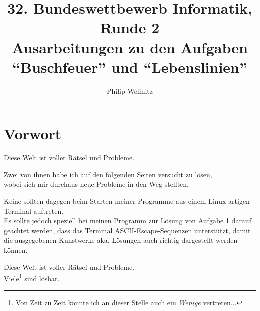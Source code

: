 \documentclass[a4paper,12pt,table]{article}
\title{32. Bundeswettbewerb Informatik, Runde 2\\ \small{Ausarbeitungen zu den Aufgaben \enquote{Buschfeuer} und \enquote{Lebenslinien} }}
\author{Philip Wellnitz}
\date{}
\begin{document}
\thispagestyle{empty}
\maketitle
\newpage
\section*{Vorwort}

Diese Welt ist voller Rätsel und Probleme.

Zwei von ihnen habe ich auf den folgenden Seiten versucht zu lösen,\\ wobei sich mir durchaus neue Probleme in den Weg stellten.

Keine sollten dagegen beim Starten meiner Programme aus einem Linux-artigen Terminal auftreten. \\
Es sollte jedoch speziell bei meinen Programm zur Lösung von Aufgabe 1 darauf geachtet werden, dass das Terminal ASCII-Escape-Sequenzen unterstützt, damit die ausgegebenen Kunstwerke aka. Lösungen auch richtig dargestellt werden können.

Diese Welt ist voller Rätsel und Probleme. \\
Viele\footnote{Von Zeit zu Zeit könnte ich an dieser Stelle auch ein \emph{Wenige} vertreten...} sind lösbar.


\tableofcontents
\newpage

\newpage

\newpage
\end{document}
